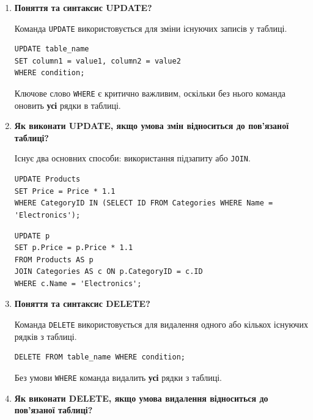 \documentclass{article}
\begin{document}
\begin{enumerate}[label=\arabic*., leftmargin=*]
        \item \textbf{Поняття та синтаксис UPDATE?}
        
        Команда \texttt{UPDATE} використовується для зміни існуючих записів у таблиці.
        \begin{CodeBox}
        \begin{verbatim}
UPDATE table_name
SET column1 = value1, column2 = value2
WHERE condition;
        \end{verbatim}
        \end{CodeBox}
        Ключове слово \texttt{WHERE} є критично важливим, оскільки без нього команда оновить \textbf{усі} рядки в таблиці.
        
        \item \textbf{Як виконати UPDATE, якщо умова змін відноситься до пов’язаної таблиці?}
        
        Існує два основних способи: використання підзапиту або \texttt{JOIN}.
        \begin{CodeBox}
        \begin{verbatim}
UPDATE Products
SET Price = Price * 1.1
WHERE CategoryID IN (SELECT ID FROM Categories WHERE Name = 'Electronics');
        \end{verbatim}
        \end{CodeBox}
        \begin{CodeBox}
        \begin{verbatim}
UPDATE p
SET p.Price = p.Price * 1.1
FROM Products AS p
JOIN Categories AS c ON p.CategoryID = c.ID
WHERE c.Name = 'Electronics';
        \end{verbatim}
        \end{CodeBox}

        \item \textbf{Поняття та синтаксис DELETE?}
        
        Команда \texttt{DELETE} використовується для видалення одного або кількох існуючих рядків з таблиці.
        \begin{CodeBox}
        \begin{verbatim}
DELETE FROM table_name WHERE condition;
        \end{verbatim}
        \end{CodeBox}
        Без умови \texttt{WHERE} команда видалить \textbf{усі} рядки з таблиці.
        
        \item \textbf{Як виконати DELETE, якщо умова видалення відноситься до пов’язаної таблиці?}
        

\end{enumerate}
\end{document}
